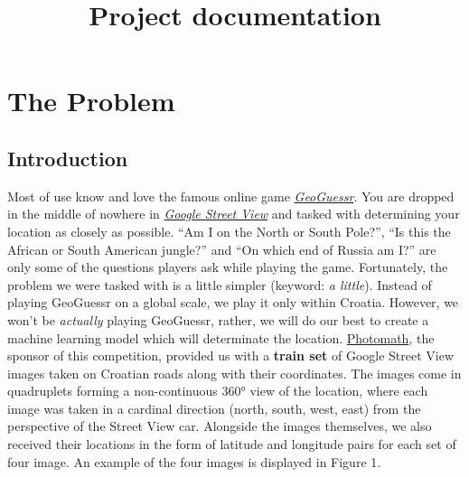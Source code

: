 \documentclass[]{article}
\title{Project documentation}
\date{}
\begin{document}
\maketitle

{
\hypersetup{linkcolor=}
\setcounter{tocdepth}{3}
\tableofcontents
}
\pagebreak

\hypertarget{the-problem}{%
\section{The Problem}\label{the-problem}}

\hypertarget{introduction}{%
\subsection{Introduction}\label{introduction}}

Most of use know and love the famous online game
\href{https://en.wikipedia.org/wiki/GeoGuessr}{\emph{GeoGuessr}}. You
are dropped in the middle of nowhere in
\href{https://www.google.com/streetview/}{\emph{Google Street View}} and
tasked with determining your location as closely as possible. ``Am I on
the North or South Pole?'', ``Is this the African or South American
jungle?'' and ``On which end of Russia am I?'' are only some of the
questions players ask while playing the game. Fortunately, the problem
we were tasked with is a little simpler (keyword: \emph{a little}).
Instead of playing GeoGuessr on a global scale, we play it only within
Croatia. However, we won't be \emph{actually} playing GeoGuessr, rather,
we will do our best to create a machine learning model which will
determinate the location. \href{https://photomath.com/en/}{Photomath},
the sponsor of this competition, provided us with a \textbf{train set}
of Google Street View images taken on Croatian roads along with their
coordinates. The images come in quadruplets forming a non-continuous
360° view of the location, where each image was taken in a cardinal
direction (north, south, west, east) from the perspective of the Street
View car. Alongside the images themselves, we also received their
locations in the form of latitude and longitude pairs for each set of
four image. An example of the four images is displayed in Figure 1.
\end{document}
